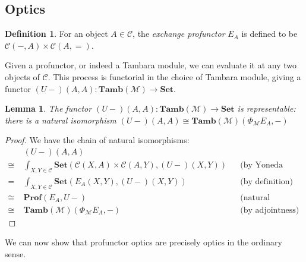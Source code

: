 \documentclass[11pt,a4paper]{article}
\theoremstyle{plain}
\newtheorem{lemma}[theorem]{Lemma}
\theoremstyle{definition}
\newtheorem{definition}[theorem]{Definition}
\newcommand{\C}{\mathscr{C}}
\newcommand{\M}{\mathscr{M}}
\newcommand{\Pastro}{\Phi}
\newcommand{\Set}{\mathbf{Set}}
\newcommand{\Prof}{\mathbf{Prof}}
\newcommand{\Tamb}{\mathbf{Tamb}}
\begin{document}
\subsection{Optics}
\begin{definition}
  For an object $A \in \C$, the \emph{exchange profunctor} $E_A$ is defined to be $\C(-, A) \times \C(A, {=})$.
\end{definition}

Given a profunctor, or indeed a Tambara module, we can evaluate it at any two objects of $\C$. This process is functorial in the choice of Tambara module, giving a functor $(U-)(A,A) : \Tamb(\M) \to \Set$.

\begin{lemma}\label{lemma-rep}
  The functor $(U-)(A,A) : \Tamb(\M) \to \Set$ is representable: there is a natural isomorphism
  $(U-)(A,A) \cong \Tamb(\M)(\Pastro_\M E_A, -)$
\end{lemma}
\begin{proof}
  We have the chain of natural isomorphisms:
  \begin{align*}
    &(U-)(A,A) \\
    \cong \;&\int_{X,Y \in \C} \Set(\C(X,A) \times \C(A,Y), (U-)(X,Y)) && \text{(by Yoneda reduction twice)} \\
    =\;&\int_{X,Y \in \C} \Set(E_A(X,Y), (U-)(X,Y)) && \text{(by definition)}\\
    \cong \;&\Prof(E_A, U-) && \text{(natural transformations as ends)} \\
    \cong \;&\Tamb(\M)(\Pastro_\M E_A, -) && \text{(by adjointness)}
  \end{align*}
\end{proof}

We can now show that profunctor optics are precisely optics in the ordinary sense.
\end{document}
